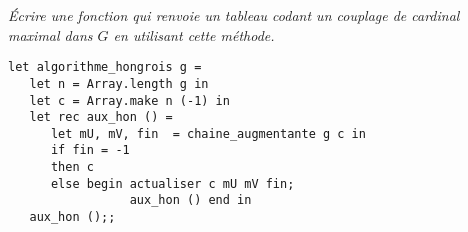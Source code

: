 \begin{Exercise}[title=]\it
Écrire une fonction  qui renvoie un tableau codant un couplage de cardinal maximal dans $G$ en utilisant cette méthode.
\end{Exercise}
\begin{Answer}
\begin{lstlisting}
let algorithme_hongrois g = 
   let n = Array.length g in
   let c = Array.make n (-1) in
   let rec aux_hon () =
      let mU, mV, fin  = chaine_augmentante g c in
      if fin = -1 
      then c
      else begin actualiser c mU mV fin;
                 aux_hon () end in
   aux_hon ();;
\end{lstlisting}
\end{Answer}
